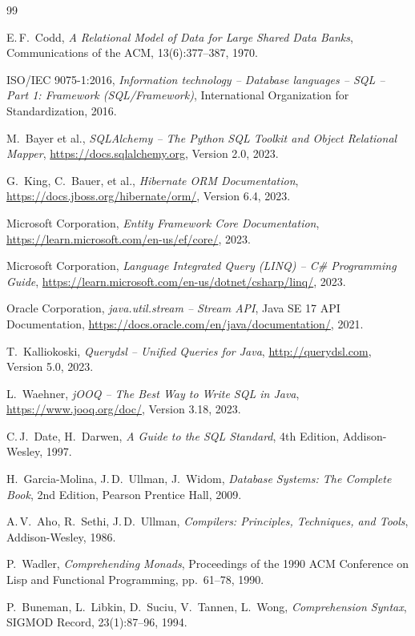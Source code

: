 \begin{thebibliography}{99}

E.\,F.\ Codd,
\textit{A Relational Model of Data for Large Shared Data Banks},
Communications of the ACM, 13(6):377--387, 1970.

ISO/IEC 9075-1:2016,
\textit{Information technology -- Database languages -- SQL -- Part 1: Framework (SQL/Framework)},
International Organization for Standardization, 2016.

M.\ Bayer et al.,
\textit{SQLAlchemy -- The Python SQL Toolkit and Object Relational Mapper},
\url{https://docs.sqlalchemy.org}, Version 2.0, 2023.

G.\ King, C.\ Bauer, et al.,
\textit{Hibernate ORM Documentation},
\url{https://docs.jboss.org/hibernate/orm/}, Version 6.4, 2023.

Microsoft Corporation,
\textit{Entity Framework Core Documentation},
\url{https://learn.microsoft.com/en-us/ef/core/}, 2023.

Microsoft Corporation,
\textit{Language Integrated Query (LINQ) -- C\# Programming Guide},
\url{https://learn.microsoft.com/en-us/dotnet/csharp/linq/}, 2023.

Oracle Corporation,
\textit{java.util.stream -- Stream API},
Java SE 17 API Documentation,
\url{https://docs.oracle.com/en/java/documentation/}, 2021.

T.\ Kalliokoski,
\textit{Querydsl -- Unified Queries for Java},
\url{http://querydsl.com}, Version 5.0, 2023.

L.\ Waehner,
\textit{jOOQ -- The Best Way to Write SQL in Java},
\url{https://www.jooq.org/doc/}, Version 3.18, 2023.

C.\,J.\ Date, H.\ Darwen,
\textit{A Guide to the SQL Standard}, 4th Edition,
Addison-Wesley, 1997.

H.\ Garcia-Molina, J.\,D.\ Ullman, J.\ Widom,
\textit{Database Systems: The Complete Book}, 2nd Edition,
Pearson Prentice Hall, 2009.

A.\,V.\ Aho, R.\ Sethi, J.\,D.\ Ullman,
\textit{Compilers: Principles, Techniques, and Tools},
Addison-Wesley, 1986.

P.\ Wadler,
\textit{Comprehending Monads},
Proceedings of the 1990 ACM Conference on Lisp and Functional Programming,
pp.\ 61--78, 1990.

P.\ Buneman, L.\ Libkin, D.\ Suciu, V.\ Tannen, L.\ Wong,
\textit{Comprehension Syntax},
SIGMOD Record, 23(1):87--96, 1994.

\end{thebibliography}


